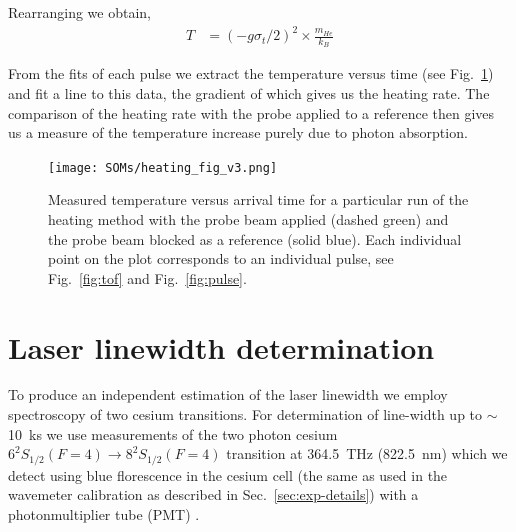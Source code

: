 \documentclass[%
 amsmath,amssymb,
aps,
]{revtex4-2}
\begin{document}
Rearranging we obtain,
\begin{align}
    T &= \left( -g \sigma_t/2\right)^2 \times \frac{m_{He}}{k_B}
\end{align}


From the fits of each pulse we extract the temperature versus time (see Fig.~\ref{fig:heating_fig}) and fit a line to this data, the gradient of which gives us the heating rate. The comparison of the heating rate with the probe applied to a reference then gives us a measure of the temperature increase purely due to photon absorption.

\begin{figure}
    \centering
    \texttt{[image: SOMs/heating\_fig\_v3.png]}
    \caption{Measured temperature versus arrival time for a particular run of the heating method with the probe beam applied (dashed green) and the probe beam blocked as a reference (solid blue). Each individual point on the plot corresponds to an individual pulse, see Fig.~\ref{fig:tof} and Fig.~\ref{fig:pulse}. }
    \label{fig:heating_fig}
\end{figure}

\section{Laser linewidth determination}
\label{sec:laser_linewidth}
To produce an independent estimation of the laser linewidth we employ spectroscopy of two cesium transitions. For determination of line-width up to $\sim$10~ks we use measurements of the two photon cesium $6^{2}S_{1/2} (F=4) \rightarrow 8^{2}S_{1/2} (F=4)$ transition at 364.5~THz (822.5~nm) which we detect using blue florescence in the cesium cell (the same as used in the wavemeter calibration as described in Sec.~\ref{sec:exp-details}) with a photonmultiplier tube (PMT) \cite{Fendel:07,Wu:13}. 
\end{document}
